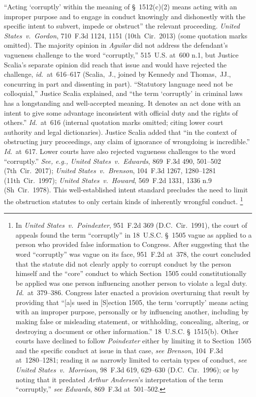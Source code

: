 ``Acting `corruptly' within the meaning of \S~1512(c)(2) means acting with an improper purpose and to engage in conduct knowingly and dishonestly with the specific intent to subvert, impede or obstruct'' the relevant proceeding.
\textit{United States~v.\ Gordon}, 710~F.3d 1124, 1151 (10th~Cir.~2013) (some quotation marks omitted).
The majority opinion in \textit{Aguilar} did not address the defendant's vagueness challenge to the word ``corruptly,'' 515~U.S. at~600 n.1, but Justice Scalia's separate opinion did reach that issue and would have rejected the challenge, \textit{id.}~at~616--617 (Scalia,~J., joined by Kennedy and Thomas,~JJ., concurring in part and dissenting in part).
``Statutory language need not be colloquial,'' Justice Scalia explained, and ``the term `corruptly' in criminal laws has a longstanding and well-accepted meaning.
It denotes an act done with an intent to give some advantage inconsistent with official duty and the rights of others.''
\textit{Id.}~at~616 (internal quotation marks omitted; citing lower court authority and legal dictionaries).
Justice Scalia added that ``in the context of obstructing jury proceedings, any claim of ignorance of wrongdoing is incredible.''
\textit{Id.}~at~617.
Lower courts have also rejected vagueness challenges to the word ``corruptly.''
\textit{See, e.g., United States~v.\ Edwards}, 869~F.3d 490, 501--502 (7th~Cir.~2017);
\textit{United States~v.\ Brenson}, 104~F.3d 1267, 1280--1281 (11th~Cir.~1997);
\textit{United States~v.\ Howard}, 569~F.2d 1331, 1336 n.9 (Sh~Cir.~1978).
This well-established intent standard precludes the need to limit the obstruction statutes to only certain kinds of inherently wrongful conduct.%
\footnote{In \textit{United States~v.\ Poindexter}, 951~F.2d 369 (D.C.~Cir.~1991), the court of appeals found the term ``corruptly'' in 18~U.S.C. \S~1505 vague as applied to a person who provided false information to Congress.
After suggesting that the word ``corruptly'' was vague on its face, 951~F.2d at~378, the court concluded that the statute did not clearly apply to corrupt conduct by the person himself and the ``core'' conduct to which Section~1505 could constitutionally be applied was one person influencing another person to violate a legal duty.
\textit{Id.}~at~379--386.
Congress later enacted a provision overturning that result by providing that ``[a]s used in [S]ection 1505, the term `corruptly' means acting with an improper purpose, personally or by influencing another, including by making false or misleading statement, or withholding, concealing, altering, or destroying a document or other information.''
18~U.S.C. \S~1515(b).
Other courts have declined to follow \textit{Poindexter} either by limiting it to Section~1505 and the specific conduct at issue in that case, \textit{see Brenson}, 104~F.3d at~1280--1281;
reading it as narrowly limited to certain types of conduct, \textit{see United States~v.\ Morrison}, 98~F.3d 619, 629--630 (D.C.~Cir.~1996);
or by noting that it predated \textit{Arthur Andersen}'s interpretation of the term ``corruptly,'' \textit{see Edwards}, 869~F.3d at~501--502.
 }

